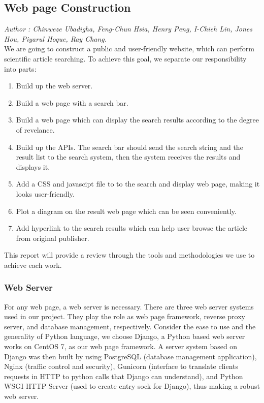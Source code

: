 \subsection{Web page Construction}
\textit{\footnotesize Author : Chinweze Ubadigha, Feng-Chun Hsia, Henry Peng, I-Chieh Lin, Jones Hou, Piyarul Hoque, Ray Chang.}\\

We are going to construct a public and user-friendly website, which can perform scientific article searching.
To achieve this goal, we separate our responsibility into parts:\\
\begin{enumerate}
	\item Build up the web server.	
	\item Build a web page with a search bar.
	\item Build a web page which can display the search results according to the degree of revelance.
	\item Build up the APIs. The search bar should send the search string and the result list to the search system, 
	then the system receives the results and displays it.
	\item Add a CSS and javascipt file to to the search and display web page, making it looks user-friendly.
	\item Plot a diagram on the result web page which can be seen conveniently.
	\item Add hyperlink to the search results which can help user browse the article from original publisher.
\end{enumerate}
This report will provide a review through the tools and methodologies we use to achieve each work.
\subsubsection{Web Server}
For any web page, a web server is necessary.
There are three web server systems used in our project. 
They play the role as web page framework, reverse proxy server, 
and database management, respectively. 
Consider the ease to use and the generality of Python language, we choose Django, 
a Python based web server works on CentOS 7, as our web page framework. A server 
system based on Django was then built by using PostgreSQL (database management application), 
Nginx (traffic control and security), Gunicorn (interface to translate clients 
requests in HTTP to python calls that Django can understand), and Python WSGI HTTP 
Server (used to create entry sock for Django), thus making a robust web server.

